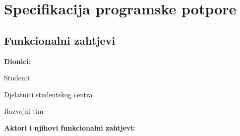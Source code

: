 \chapter{Specifikacija programske potpore}

\section{Funkcionalni zahtjevi}

\noindent \textbf{Dionici:}

\begin{packed_enum}
	
	\item Studenti
	\item Djelatnici studentskog centra			
	\item Razvojni tim
	
\end{packed_enum}

\noindent \textbf{Aktori i njihovi funkcionalni zahtjevi:}


